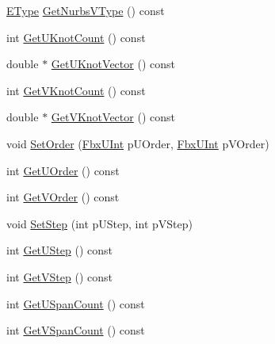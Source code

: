 \begin{DoxyCompactItemize}
\hyperlink{class_fbx_nurbs_surface_a87c1fcd98d8fa511ee6c6166346a46b3}{E\+Type} \hyperlink{class_fbx_nurbs_surface_a8e1f509e97a93380853aa0a009aa7a01}{Get\+Nurbs\+V\+Type} () const
\item 
int \hyperlink{class_fbx_nurbs_surface_adc42200550501843d8a31b9a3d895337}{Get\+U\+Knot\+Count} () const
\item 
double $\ast$ \hyperlink{class_fbx_nurbs_surface_a34c4fa7619bbd3293074929f14d1ae42}{Get\+U\+Knot\+Vector} () const
\item 
int \hyperlink{class_fbx_nurbs_surface_aa1776426c0e8b230c302d9c90b0244f9}{Get\+V\+Knot\+Count} () const
\item 
double $\ast$ \hyperlink{class_fbx_nurbs_surface_ac12a9bb5194931ba8be016dd0d309e9f}{Get\+V\+Knot\+Vector} () const
\item 
void \hyperlink{class_fbx_nurbs_surface_ad15927332a22dbd3f1f4ae51418d14c4}{Set\+Order} (\hyperlink{fbxtypes_8h_ae9fb141d8158a730aa85ec5ff2ea3f6b}{Fbx\+U\+Int} p\+U\+Order, \hyperlink{fbxtypes_8h_ae9fb141d8158a730aa85ec5ff2ea3f6b}{Fbx\+U\+Int} p\+V\+Order)
\item 
int \hyperlink{class_fbx_nurbs_surface_ac085e8d245849e5864bf8fd192eeb62e}{Get\+U\+Order} () const
\item 
int \hyperlink{class_fbx_nurbs_surface_a9727565bce4253b1d44e2fcd3a712f7b}{Get\+V\+Order} () const
\item 
void \hyperlink{class_fbx_nurbs_surface_a8da4f135539ccdb54716ea1c2ec0fb89}{Set\+Step} (int p\+U\+Step, int p\+V\+Step)
\item 
int \hyperlink{class_fbx_nurbs_surface_aa726194cee04c25a68b695e5588d62eb}{Get\+U\+Step} () const
\item 
int \hyperlink{class_fbx_nurbs_surface_aa5159d6706750fe43de222b7333b9b7a}{Get\+V\+Step} () const
\item 
int \hyperlink{class_fbx_nurbs_surface_af42bb32cacf0ceb7616db1a28e5b27e1}{Get\+U\+Span\+Count} () const
\item 
int \hyperlink{class_fbx_nurbs_surface_a7ced12d93b7736902f0ca7a8aa968f04}{Get\+V\+Span\+Count} () const
\end{DoxyCompactItemize}
